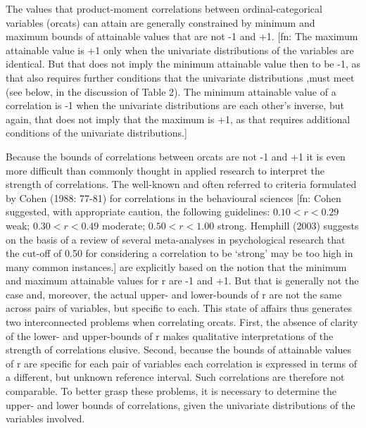\documentclass[
  12pt,
]{article}
\theoremstyle{plain}
\theoremstyle{definition}
\theoremstyle{remark}
\begin{document}
The values that product-moment correlations between ordinal-categorical
variables (orcats) can attain are generally constrained by minimum and
maximum bounds of attainable values that are not -1 and +1. {[}fn: The
maximum attainable value is +1 only when the univariate distributions of
the variables are identical. But that does not imply the minimum
attainable value then to be -1, as that also requires further conditions
that the univariate distributions ,must meet (see below, in the
discussion of Table 2). The minimum attainable value of a correlation is
-1 when the univariate distributions are each other's inverse, but
again, that does not imply that the maximum is +1, as that requires
additional conditions of the univariate distributions.{]}

Because the bounds of correlations between orcats are not -1 and +1 it
is even more difficult than commonly thought in applied research to
interpret the strength of correlations. The well-known and often
referred to criteria formulated by Cohen (1988: 77-81) for correlations
in the behavioural sciences {[}fn: Cohen suggested, with appropriate
caution, the following guidelines: \(0.10<r<0.29\) weak; \(0.30<r<0.49\)
moderate; \(0.50<r<1.00\) strong. Hemphill (2003) suggests on the basis
of a review of several meta-analyses in psychological research that the
cut-off of 0.50 for considering a correlation to be `strong' may be too
high in many common instances.{]} are explicitly based on the notion
that the minimum and maximum attainable values for r are -1 and +1. But
that is generally not the case and, moreover, the actual upper- and
lower-bounds of r are not the same across pairs of variables, but
specific to each. This state of affairs thus generates two
interconnected problems when correlating orcats. First, the absence of
clarity of the lower- and upper-bounds of r makes qualitative
interpretations of the strength of correlations elusive. Second, because
the bounds of attainable values of r are specific for each pair of
variables each correlation is expressed in terms of a different, but
unknown reference interval. Such correlations are therefore not
comparable. To better grasp these problems, it is necessary to determine
the upper- and lower bounds of correlations, given the univariate
distributions of the variables involved.
\end{document}
